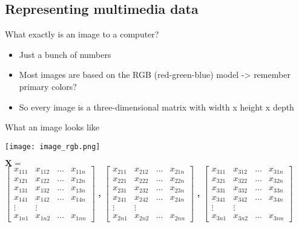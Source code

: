 

\subsection{Representing multimedia data}

\begin{frame}{What exactly is an image to a computer?}
  \begin{itemize}
  \item Just a bunch of numbers
  \item Most images are based on the RGB (red-green-blue) model -> remember primary colors?
  \item So every image is a three-dimensional matrix with width x height x depth
  \end{itemize}
\end{frame}

\begin{frame}{What an image looks like}

  \texttt{[image: image\_rgb.png]}
  
  $\mathbf{X} = $ \\ \vspace{0.2cm}
\scriptsize
\color{red}
$
\begin{bmatrix}
x_{111} & x_{112} & \hdots &  x_{11n} \\
x_{121} & x_{122} & \hdots &  x_{12n} \\
x_{131} & x_{132} & \hdots &  x_{13n}  \\
x_{141} & x_{142} & \hdots &  x_{14n}  \\
	\vdots & \vdots \\

x_{1n1} & x_{1n2} & \hdots &  x_{1nn}  
\end{bmatrix}
$ \color{black} \textbf{,} \color{green}
$
\begin{bmatrix}
x_{211} & x_{212} & \hdots &  x_{21n} \\
x_{221} & x_{222} & \hdots &  x_{22n} \\
x_{231} & x_{232} & \hdots &  x_{23n}  \\
x_{241} & x_{242} & \hdots &  x_{24n}  \\
	\vdots & \vdots \\

x_{2n1} & x_{2n2} & \hdots &  x_{2nn}  
\end{bmatrix}
$ \color{black} \textbf{,} \color{blue}
$
\begin{bmatrix}
x_{311} & x_{312} & \hdots &  x_{31n} \\
x_{321} & x_{322} & \hdots &  x_{32n} \\
x_{331} & x_{332} & \hdots &  x_{33n}  \\
x_{341} & x_{342} & \hdots &  x_{34n}  \\
	\vdots & \vdots \\

x_{3n1} & x_{3n2} & \hdots &  x_{3nn}  
\end{bmatrix}
$
\end{frame}

